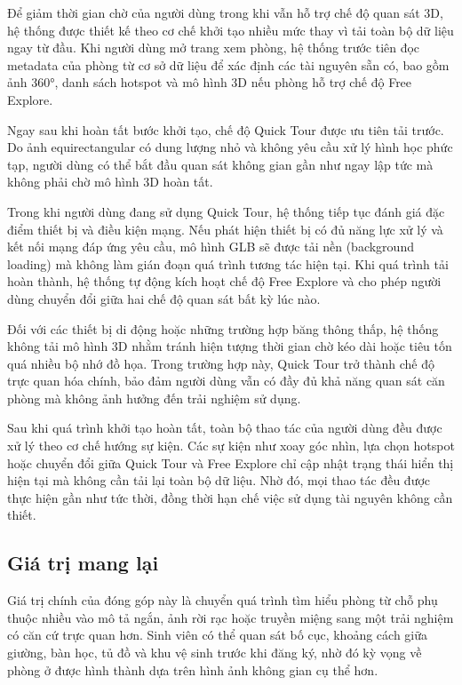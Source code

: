 \documentclass[../DoAn.tex]{subfiles}
\begin{document}
Để giảm thời gian chờ của người dùng trong khi vẫn hỗ trợ chế độ quan sát 3D,
hệ thống được thiết kế theo cơ chế khởi tạo nhiều mức thay vì tải toàn bộ dữ
liệu ngay từ đầu. Khi người dùng mở trang xem phòng, hệ thống trước tiên đọc
metadata của phòng từ cơ sở dữ liệu để xác định các tài nguyên sẵn có, bao gồm
ảnh 360°, danh sách hotspot và mô hình 3D nếu phòng hỗ trợ chế độ Free
Explore.

Ngay sau khi hoàn tất bước khởi tạo, chế độ Quick Tour được ưu tiên tải trước.
Do ảnh equirectangular có dung lượng nhỏ và không yêu cầu xử lý hình học phức
tạp, người dùng có thể bắt đầu quan sát không gian gần như ngay lập tức mà
không phải chờ mô hình 3D hoàn tất.

Trong khi người dùng đang sử dụng Quick Tour, hệ thống tiếp tục đánh giá đặc
điểm thiết bị và điều kiện mạng. Nếu phát hiện thiết bị có đủ năng lực xử lý và
kết nối mạng đáp ứng yêu cầu, mô hình GLB sẽ được tải nền (background loading)
mà không làm gián đoạn quá trình tương tác hiện tại. Khi quá trình tải hoàn
thành, hệ thống tự động kích hoạt chế độ Free Explore và cho phép người dùng
chuyển đổi giữa hai chế độ quan sát bất kỳ lúc nào.

Đối với các thiết bị di động hoặc những trường hợp băng thông thấp, hệ thống
không tải mô hình 3D nhằm tránh hiện tượng thời gian chờ kéo dài hoặc tiêu tốn
quá nhiều bộ nhớ đồ họa. Trong trường hợp này, Quick Tour trở thành chế độ trực
quan hóa chính, bảo đảm người dùng vẫn có đầy đủ khả năng quan sát căn phòng
mà không ảnh hưởng đến trải nghiệm sử dụng.

Sau khi quá trình khởi tạo hoàn tất, toàn bộ thao tác của người dùng đều được
xử lý theo cơ chế hướng sự kiện. Các sự kiện như xoay góc nhìn, lựa chọn
hotspot hoặc chuyển đổi giữa Quick Tour và Free Explore chỉ cập nhật trạng thái
hiển thị hiện tại mà không cần tải lại toàn bộ dữ liệu. Nhờ đó, mọi thao tác
đều được thực hiện gần như tức thời, đồng thời hạn chế việc sử dụng tài nguyên
không cần thiết.

\subsection{Giá trị mang lại}
\label{subsec:viz_value}

Giá trị chính của đóng góp này là chuyển quá trình tìm hiểu phòng từ chỗ phụ
thuộc nhiều vào mô tả ngắn, ảnh rời rạc hoặc truyền miệng sang một trải nghiệm
có căn cứ trực quan hơn. Sinh viên có thể quan sát bố cục, khoảng cách giữa
giường, bàn học, tủ đồ và khu vệ sinh trước khi đăng ký, nhờ đó kỳ vọng về
phòng ở được hình thành dựa trên hình ảnh không gian cụ thể hơn.
\end{document}
